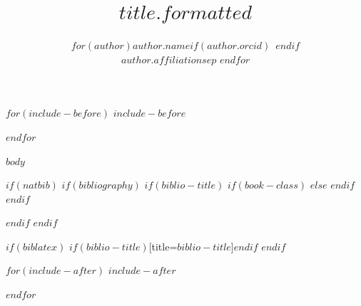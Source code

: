\documentclass[$if(classoption)$$for(classoption)$$classoption$$sep$,$endfor$$else$article$endif$]{$documentclass$}
\author{
$for(author)$$author.name$$if(author.orcid)$~\orcidlink{$author.orcid$}$endif$\\$author.affiliation$$sep$ \And $endfor$
}
\title{$title.formatted$}
\begin{document}
$for(include-before)$
$include-before$

$endfor$


$body$

$if(natbib)$
$if(bibliography)$
$if(biblio-title)$
$if(book-class)$
\renewcommand\bibname{$biblio-title$}
$else$
\renewcommand\refname{$biblio-title$}
$endif$
$endif$

$endif$
$endif$

$if(biblatex)$
\printbibliography$if(biblio-title)$[title=$biblio-title$]$endif$
$endif$

$for(include-after)$
$include-after$

$endfor$
\end{document}
